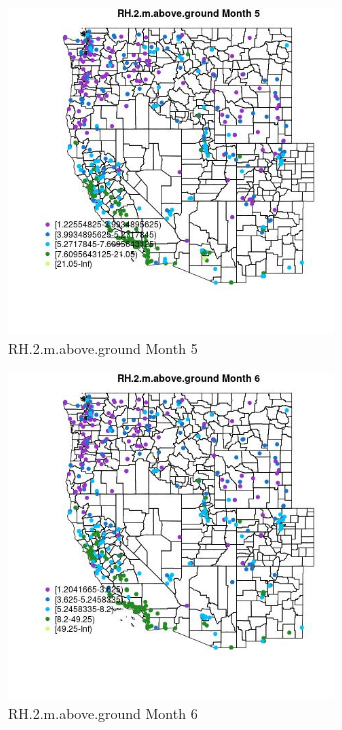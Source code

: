 \begin{figure} 
\centering  
\includegraphics[width=0.77\textwidth]{Code_Outputs/ML_input_report_ML_input_PM25_Step5_part_d_de_duplicated_aves_ML_input_MapObsMo5RH2maboveground.jpg} 
\caption{\label{fig:ML_input_report_ML_input_PM25_Step5_part_d_de_duplicated_aves_ML_inputMapObsMo5RH2maboveground}RH.2.m.above.ground Month 5} 
\end{figure} 
 

\clearpage 

\begin{figure} 
\centering  
\includegraphics[width=0.77\textwidth]{Code_Outputs/ML_input_report_ML_input_PM25_Step5_part_d_de_duplicated_aves_ML_input_MapObsMo6RH2maboveground.jpg} 
\caption{\label{fig:ML_input_report_ML_input_PM25_Step5_part_d_de_duplicated_aves_ML_inputMapObsMo6RH2maboveground}RH.2.m.above.ground Month 6} 
\end{figure} 
 

